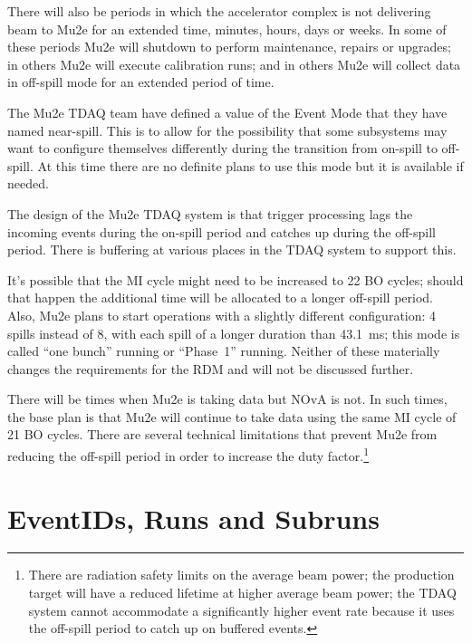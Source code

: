 There will also be periods in which the accelerator complex is not delivering
beam to Mu2e for an extended time, minutes, hours, days or weeks.
In some of these periods Mu2e will shutdown to perform maintenance, repairs or upgrades;
in others Mu2e will execute calibration runs;
and in others Mu2e will collect data in off-spill mode for an extended period of time.


The Mu2e TDAQ team have defined a value of the Event Mode that they have named near-spill.
This is to allow for the possibility that some subsystems may want to
configure themselves differently during the transition from on-spill to off-spill.
At this time there are no definite plans to use this mode but it is available if needed.

The design of the Mu2e TDAQ system is that trigger processing lags the incoming events
during the on-spill period and catches up during the off-spill period.  There is
buffering at various places in the TDAQ system to support this.

It's possible that the MI cycle might need to be increased to 22 BO cycles;
should that happen the additional time will be allocated to a longer off-spill period.
Also, Mu2e plans to start operations with a slightly different configuration:
4 spills instead of 8, with each spill of a longer duration than 43.1~ms;
this mode is called ``one bunch'' running or ``Phase~1'' running.
Neither of these materially changes the requirements for the RDM and
will not be discussed further.

There will be times when Mu2e is taking data but NOvA is not.
In such times, the base plan is that Mu2e will continue to take data using the same MI cycle of 21 BO cycles.
There are several technical limitations that prevent Mu2e from reducing the off-spill period
in order to increase the duty factor.\footnote{
There are radiation safety limits on the average beam power;
the production target will have a reduced lifetime at higher average beam power;
the TDAQ system cannot accommodate a significantly higher event rate because it
uses the off-spill period to catch up on buffered events.
}

\section{EventIDs, Runs and Subruns}
\label{sec:TagsIDsRunsSubRuns}


